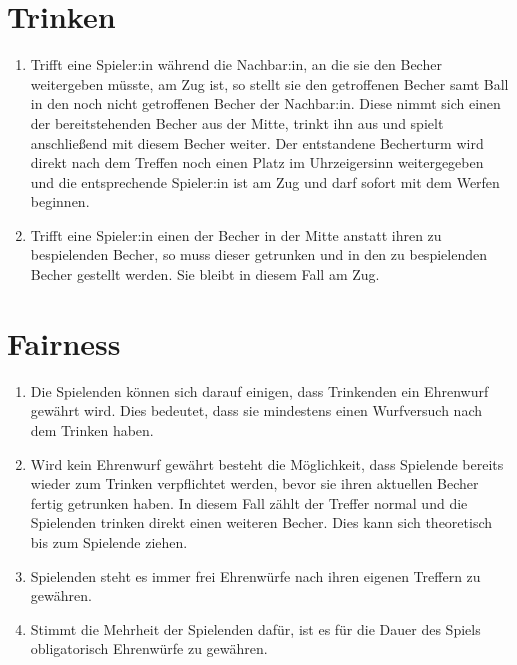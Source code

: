 \section{Trinken}
\begin{enumerate}[label={(\arabic*)}]
    \item
    Trifft eine Spieler:in während die Nachbar:in, an die sie den Becher weitergeben müsste, am Zug ist, so stellt sie den getroffenen Becher samt Ball in den noch nicht getroffenen Becher der Nachbar:in.
    Diese nimmt sich einen der bereitstehenden Becher aus der Mitte, trinkt ihn aus und spielt anschließend mit diesem Becher weiter.
    Der entstandene Becherturm wird direkt nach dem Treffen noch einen Platz im Uhrzeigersinn weitergegeben und die entsprechende Spieler:in ist am Zug und darf sofort mit dem Werfen beginnen.

    \item
    Trifft eine Spieler:in einen der Becher in der Mitte anstatt ihren zu bespielenden Becher, so muss dieser getrunken und in den zu bespielenden Becher gestellt werden.
    Sie bleibt in diesem Fall am Zug.
\end{enumerate}

\section{Fairness}
\begin{enumerate}[label={(\arabic*)}]
    \item
    Die Spielenden können sich darauf einigen, dass Trinkenden ein \glqq{} Ehrenwurf\grqq{} gewährt wird.
    Dies bedeutet, dass sie mindestens einen Wurfversuch nach dem Trinken haben.

    \item
    Wird kein Ehrenwurf gewährt besteht die Möglichkeit, dass Spielende bereits wieder zum Trinken verpflichtet werden, bevor sie ihren aktuellen Becher fertig getrunken haben.
    In diesem Fall zählt der Treffer normal und die Spielenden trinken direkt einen weiteren Becher.
    Dies kann sich theoretisch bis zum Spielende ziehen.

    \item
    Spielenden steht es immer frei Ehrenwürfe nach ihren eigenen Treffern zu gewähren.

    \item
    Stimmt die Mehrheit der Spielenden dafür, ist es für die Dauer des Spiels obligatorisch Ehrenwürfe zu gewähren.
\end{enumerate}
